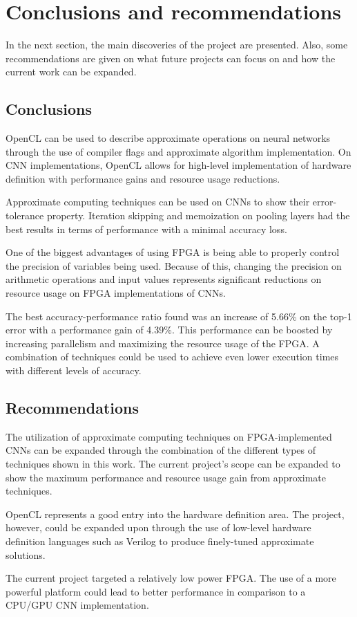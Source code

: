 \chapter{Conclusions and recommendations}

In the next section, the main discoveries of the project are
presented. Also, some recommendations are given on what
future projects can focus on and how the current work
can be expanded.

\section{Conclusions}

OpenCL can be used to describe approximate operations on neural networks through
the use of compiler flags and approximate algorithm
implementation. On CNN implementations, OpenCL allows
for high-level implementation of hardware definition with
performance gains and resource usage reductions.

Approximate computing techniques can be used
on CNNs to show their error-tolerance property. 
Iteration skipping and memoization 
on pooling layers had
the best results in terms of performance with a minimal accuracy loss.

One of the biggest advantages of using FPGA is being able to properly control
the precision of variables being used. Because of this, changing the precision
on arithmetic operations and input values represents significant reductions on resource
usage on FPGA implementations of CNNs.

The best accuracy-performance ratio found was an increase of 5.66\% on the top-1 error
with a performance gain of 4.39\%. This performance can be boosted
by increasing parallelism and maximizing the resource usage
of the FPGA. A combination of techniques could be used to achieve even 
lower execution times with different levels of accuracy.

\section{Recommendations}

The utilization of approximate computing techniques on FPGA-implemented
CNNs can be expanded through the combination of the different types
of techniques shown in this work. The current project's scope can
be expanded to show the maximum performance and resource usage gain
from approximate techniques.

OpenCL represents a good entry into the hardware definition area.
The project, however, could be expanded upon through the use of
low-level hardware definition languages such as Verilog to produce
finely-tuned approximate solutions.

The current project targeted a relatively low power FPGA. The use
of a more powerful platform could lead to better performance
in comparison to a CPU/GPU CNN implementation.